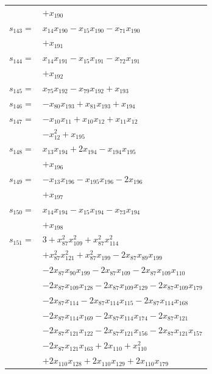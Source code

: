 \begin{longtable}{@{}r@{\;}l@{}}
 & \(\displaystyle +x_{190}\) \\[3pt]
\(s_{143}=\) & \(\displaystyle x_{14}x_{190} -x_{15}x_{190} -x_{71}x_{190}\) \\
 & \(\displaystyle +x_{191}\) \\[3pt]
\(s_{144}=\) & \(\displaystyle x_{14}x_{191} -x_{15}x_{191} -x_{72}x_{191}\) \\
 & \(\displaystyle +x_{192}\) \\[3pt]
\(s_{145}=\) & \(\displaystyle x_{75}x_{192} -x_{79}x_{192} +x_{193}\) \\[3pt]
\(s_{146}=\) & \(\displaystyle -x_{80}x_{193} +x_{81}x_{193} +x_{194}\) \\[3pt]
\(s_{147}=\) & \(\displaystyle -x_{10}x_{11} +x_{10}x_{12} +x_{11}x_{12}\) \\
 & \(\displaystyle -x_{12}^{2} +x_{195}\) \\[3pt]
\(s_{148}=\) & \(\displaystyle x_{13}x_{194} +2x_{194} -x_{194}x_{195}\) \\
 & \(\displaystyle +x_{196}\) \\[3pt]
\(s_{149}=\) & \(\displaystyle -x_{13}x_{196} -x_{195}x_{196} -2x_{196}\) \\
 & \(\displaystyle +x_{197}\) \\[3pt]
\(s_{150}=\) & \(\displaystyle x_{14}x_{194} -x_{15}x_{194} -x_{73}x_{194}\) \\
 & \(\displaystyle +x_{198}\) \\[3pt]
\(s_{151}=\) & \(\displaystyle 3 +x_{87}^{2}x_{109}^{2} +x_{87}^{2}x_{114}^{2}\) \\
 & \(\displaystyle +x_{87}^{2}x_{121}^{2} +x_{87}^{2}x_{199} -2x_{87}x_{89}x_{199}\) \\
 & \(\displaystyle -2x_{87}x_{90}x_{199} -2x_{87}x_{109} -2x_{87}x_{109}x_{110}\) \\
 & \(\displaystyle -2x_{87}x_{109}x_{128} -2x_{87}x_{109}x_{129} -2x_{87}x_{109}x_{179}\) \\
 & \(\displaystyle -2x_{87}x_{114} -2x_{87}x_{114}x_{115} -2x_{87}x_{114}x_{168}\) \\
 & \(\displaystyle -2x_{87}x_{114}x_{169} -2x_{87}x_{114}x_{174} -2x_{87}x_{121}\) \\
 & \(\displaystyle -2x_{87}x_{121}x_{122} -2x_{87}x_{121}x_{156} -2x_{87}x_{121}x_{157}\) \\
 & \(\displaystyle -2x_{87}x_{121}x_{163} +2x_{110} +x_{110}^{2}\) \\
 & \(\displaystyle +2x_{110}x_{128} +2x_{110}x_{129} +2x_{110}x_{179}\) \\

\end{longtable}
